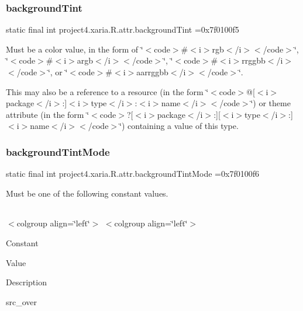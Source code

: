 \subsubsection{\texorpdfstring{background\+Tint}{backgroundTint}}
{\footnotesize\ttfamily static final int project4.\+xaria.\+R.\+attr.\+background\+Tint =0x7f0100f5\hspace{0.3cm}{\ttfamily [static]}}

Must be a color value, in the form of \char`\"{}$<$code$>$\#$<$i$>$rgb$<$/i$>$$<$/code$>$\char`\"{}, \char`\"{}$<$code$>$\#$<$i$>$argb$<$/i$>$$<$/code$>$\char`\"{}, \char`\"{}$<$code$>$\#$<$i$>$rrggbb$<$/i$>$$<$/code$>$\char`\"{}, or \char`\"{}$<$code$>$\#$<$i$>$aarrggbb$<$/i$>$$<$/code$>$\char`\"{}. 

This may also be a reference to a resource (in the form \char`\"{}$<$code$>$@\mbox{[}$<$i$>$package$<$/i$>$\+:\mbox{]}$<$i$>$type$<$/i$>$\+:$<$i$>$name$<$/i$>$$<$/code$>$\char`\"{}) or theme attribute (in the form \char`\"{}$<$code$>$?\mbox{[}$<$i$>$package$<$/i$>$\+:\mbox{]}\mbox{[}$<$i$>$type$<$/i$>$\+:\mbox{]}$<$i$>$name$<$/i$>$$<$/code$>$\char`\"{}) containing a value of this type. \mbox{\label{classproject4_1_1xaria_1_1R_1_1attr_a17bbcc43fe1098896481231e78ea4168}} 
\subsubsection{\texorpdfstring{background\+Tint\+Mode}{backgroundTintMode}}
{\footnotesize\ttfamily static final int project4.\+xaria.\+R.\+attr.\+background\+Tint\+Mode =0x7f0100f6\hspace{0.3cm}{\ttfamily [static]}}

Must be one of the following constant values.

\tabulinesep=1mm
\begin{longtabu} spread 0pt [c]{*{0}{|X[-1]}|}
\hline
\end{longtabu}
$<$colgroup align=\char`\"{}left\char`\"{}$>$ $<$colgroup align=\char`\"{}left\char`\"{}$>$ 

Constant

Value

Description 

{\ttfamily src\+\_\+over}

